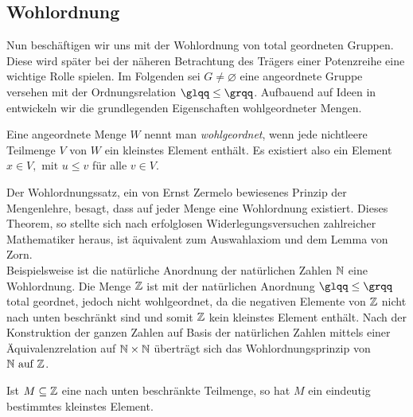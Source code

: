 \subsection{Wohlordnung}
Nun beschäftigen wir uns mit der Wohlordnung von total geordneten Gruppen. Diese wird später bei der näheren Betrachtung des Trägers einer Potenzreihe eine wichtige Rolle spielen. 
Im Folgenden sei $G \neq \varnothing$ eine angeordnete Gruppe versehen mit der Ordnungsrelation $\glqq\leq \grqq$. Aufbauend auf Ideen in \cite[S. 16]{fuchs66} entwickeln wir die grundlegenden Eigenschaften wohlgeordneter Mengen.
\begin{defn} \label{wohlgeordn} %
Eine angeordnete Menge $W$ nennt man \textit{wohlgeordnet}, wenn jede nichtleere Teilmenge $V$ von $W$ ein kleinstes Element enthält. Es existiert also ein Element $ x \in V, \text{ mit } u \le v $ für alle $ v \in V.$ 
\end{defn}
%
Der Wohlordnungssatz, ein von Ernst Zermelo bewiesenes Prinzip der Mengenlehre, besagt, dass auf jeder Menge eine Wohlordnung existiert. Dieses Theorem, so stellte sich nach erfolglosen Widerlegungsversuchen zahlreicher Mathematiker heraus, ist äquivalent zum Auswahlaxiom und dem Lemma von Zorn. \\
Beispielsweise ist die natürliche Anordnung der natürlichen Zahlen $\mathbb{N}$ eine Wohlordnung. Die Menge $\mathbb{Z}$ ist mit der natürlichen Anordnung $\glqq\leq\grqq$ total geordnet, jedoch nicht wohlgeordnet, da die negativen Elemente von $\mathbb{Z}$ nicht nach unten beschränkt sind und somit $\mathbb{Z}$ kein kleinstes Element enthält. Nach der Konstruktion der ganzen Zahlen auf Basis der natürlichen Zahlen mittels einer Äquivalenzrelation auf $\mathbb{N} \times \mathbb{N}$  überträgt sich das Wohlordnungsprinzip von $\mathbb{N} \text{ auf } \mathbb{Z}$.
\begin{bem} %
Ist $M \subseteq \mathbb{Z}$ eine nach unten beschränkte Teilmenge, so hat $M$ ein eindeutig bestimmtes kleinstes Element. 
\end{bem} 

